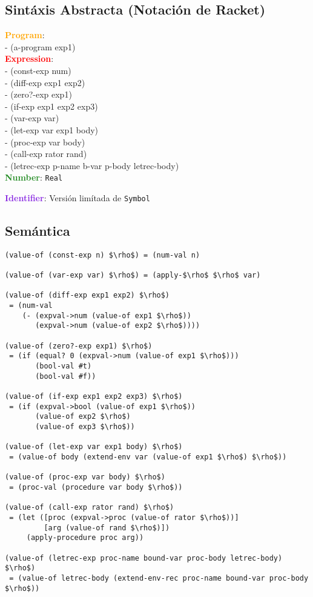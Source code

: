 \documentclass[11pt]{article}
\newcommand\Program{\textcolor{Orange}{\textbf{Program}}}
\newcommand\Expression{\textcolor{Red}{\textbf{Expression}}}
\newcommand\Number{\textcolor{ForestGreen}{\textbf{Number}}}
\newcommand\Identifier{\textcolor{BlueViolet}{\textbf{Identifier}}}
\begin{document}
\subsection*{Sintáxis Abstracta (Notación de Racket)}
\Program: \\
- (a-program exp1) \\

\noindent \Expression: \\
- (const-exp num) \\
- (diff-exp exp1 exp2) \\
- (zero?-exp exp1) \\
- (if-exp exp1 exp2 exp3) \\
- (var-exp var) \\
- (let-exp var exp1 body) \\
- (proc-exp var body) \\ 
- (call-exp rator rand) \\
- (letrec-exp p-name b-var p-body letrec-body) \\

\noindent \Number: \verb|Real|

\noindent \Identifier: Versión limítada de \verb|Symbol|

\subsection*{Semántica}

\begin{lstlisting}[mathescape]
(value-of (const-exp n) $\rho$) = (num-val n)

(value-of (var-exp var) $\rho$) = (apply-$\rho$ $\rho$ var)

(value-of (diff-exp exp1 exp2) $\rho$)
 = (num-val
    (- (expval->num (value-of exp1 $\rho$))
       (expval->num (value-of exp2 $\rho$))))

(value-of (zero?-exp exp1) $\rho$)
 = (if (equal? 0 (expval->num (value-of exp1 $\rho$)))
       (bool-val #t)
       (bool-val #f))

(value-of (if-exp exp1 exp2 exp3) $\rho$)
 = (if (expval->bool (value-of exp1 $\rho$))
       (value-of exp2 $\rho$)
       (value-of exp3 $\rho$))

(value-of (let-exp var exp1 body) $\rho$)
 = (value-of body (extend-env var (value-of exp1 $\rho$) $\rho$))

(value-of (proc-exp var body) $\rho$)
 = (proc-val (procedure var body $\rho$))

(value-of (call-exp rator rand) $\rho$)
 = (let ([proc (expval->proc (value-of rator $\rho$))]
         [arg (value-of rand $\rho$)])
     (apply-procedure proc arg))
     
(value-of (letrec-exp proc-name bound-var proc-body letrec-body) $\rho$)
 = (value-of letrec-body (extend-env-rec proc-name bound-var proc-body $\rho$))




\end{lstlisting}
\end{document}
